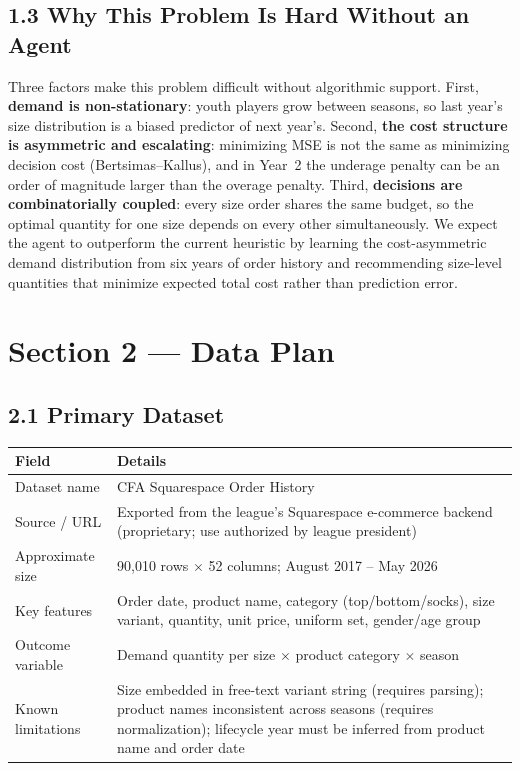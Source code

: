 \documentclass[11pt]{article}
\begin{document}
\subsection*{1.3 \; Why This Problem Is Hard Without an Agent}

Three factors make this problem difficult without algorithmic support. First, \textbf{demand is
non-stationary}: youth players grow between seasons, so last year's size distribution is a biased
predictor of next year's. Second, \textbf{the cost structure is asymmetric and escalating}: minimizing
MSE is not the same as minimizing decision cost (Bertsimas--Kallus), and in Year~2 the underage penalty
can be an order of magnitude larger than the overage penalty. Third, \textbf{decisions are
combinatorially coupled}: every size order shares the same budget, so the optimal quantity for one size
depends on every other simultaneously. We expect the agent to outperform the current heuristic by
learning the cost-asymmetric demand distribution from six years of order history and recommending
size-level quantities that minimize expected total cost rather than prediction error.

\section{Section 2 — Data Plan}

\subsection*{2.1 \; Primary Dataset}

\begin{center}
\small
\begin{tabular}{@{}p{3.2cm}p{12.5cm}@{}}
\toprule
\textbf{Field} & \textbf{Details} \\
\midrule
Dataset name     & CFA Squarespace Order History \\
Source / URL     & Exported from the league's Squarespace e-commerce backend (proprietary; use authorized by league president) \\
Approximate size & 90{,}010 rows $\times$ 52 columns; August 2017 -- May 2026 \\
Key features     & Order date, product name, category (top/bottom/socks), size variant, quantity, unit price, uniform set, gender/age group \\
Outcome variable & Demand quantity per size $\times$ product category $\times$ season \\
Known limitations & Size embedded in free-text variant string (requires parsing); product names inconsistent across seasons (requires normalization); lifecycle year must be inferred from product name and order date \\
\bottomrule
\end{tabular}
\end{center}
\end{document}
